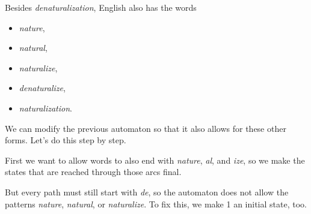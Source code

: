\begin{examplebox}
    Besides \emph{denaturalization}, English also has the words
     
    \begin{itemize}
        \item \emph{nature},
        \item \emph{natural},
        \item \emph{naturalize},
        \item \emph{denaturalize},
        \item \emph{naturalization}.
    \end{itemize}
     
    We can modify the previous automaton so that it also allows for these other forms. 
    Let's do this step by step.

    First we want to allow words to also end with \emph{nature}, \emph{al}, and \emph{ize}, so we make the states that are reached through those arcs final.
    \begin{center}
    \end{center}
    
    But every path must still start with \emph{de}, so the automaton does not allow the patterns \emph{nature}, \emph{natural}, or \emph{naturalize}.
    To fix this, we make 1 an initial state, too.
    \begin{center}
    \end{center}
    

\end{examplebox}
